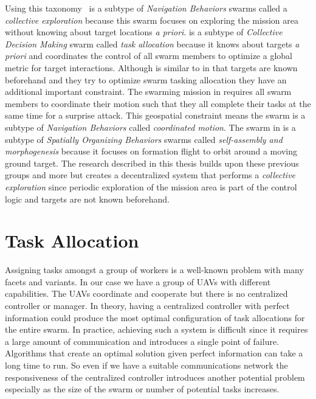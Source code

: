Using this taxonomy~\cite{jin} is a subtype of \textit{Navigation Behaviors} swarms called a \textit{collective exploration} because this swarm focuses on exploring the mission area without knowing about target locations \textit{a priori}.  \cite{bellingham} is a subtype of \textit{Collective Decision Making} swarm called \textit{task allocation}  because it knows about targets \textit{a priori} and coordinates the control of all swarm members to optimize a global metric for target interactions.  Although \cite{beard} is similar to \cite{bellingham} in that targets are known beforehand and they try to optimize swarm tasking allocation they have an additional important constraint.  The swarming mission in \cite{beard} requires all swarm members to coordinate their motion such that they all complete their tasks at the same time for a surprise attack. This geospatial constraint means the swarm is a subtype of \textit{Navigation Behaviors} called \textit{coordinated motion}.  The swarm in \cite{wheeler} is a subtype of \textit{Spatially Organizing Behaviors} swarms called \textit{self-assembly and morphogenesis} because it focuses on formation flight to orbit around a moving ground target.  The research described in this thesis builds upon these previous groups and more but creates a decentralized system that performs a \textit{collective exploration} since periodic exploration of the mission area is part of the control logic and targets are not known beforehand.

\section{Task Allocation}
\label{sec:uncoordTaskingRelated}

Assigning tasks amongst a group of workers is a well-known problem with many facets and variants.  In our case we have a group of UAVs with different capabilities.  The UAVs coordinate and cooperate but there is no centralized controller or manager.   In theory, having a centralized controller with perfect information could produce the most optimal configuration of task allocations for the entire swarm.  In practice, achieving such a system is difficult since it requires a large amount of communication and introduces a single point of failure.  Algorithms that create an optimal solution given perfect information can take a long time to run.  So even if we have a suitable communications network the responsiveness of the centralized controller introduces another potential problem especially as the size of the swarm or number of potential tasks increases.

